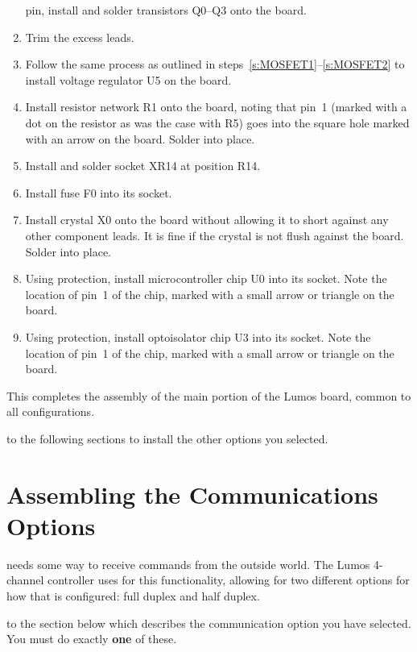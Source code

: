\documentclass[letterpaper,twoside,onecolumn,openright,final]{memoir}
\begin{document}
\begin{enumerate}
	pin, install and solder transistors Q0--Q3 onto the board.
\item\label{s:MOSFET2}
	Trim the excess leads.
\item
	Follow the same process as outlined in steps~\ref{s:MOSFET1}--\ref{s:MOSFET2}
	to install voltage regulator U5 on the board.
\item
	Install resistor network R1 onto the board, noting that pin~1 (marked
	with a dot on the resistor as was the case with R5) goes into the
	square hole marked with an arrow on the board.  Solder into place.
\item	Install and solder socket XR14 at position R14.
\item	Install fuse F0 into its socket.
\item 	Install crystal X0 onto the board without allowing it to short
	against any other component leads.  It is fine if the crystal
	is not flush against the board.  Solder into place.
\item	Using  protection, install microcontroller chip U0 into its socket.  Note the location of pin~1 of the chip, marked with a small 
	arrow or triangle on the board.
\item	Using  protection, install optoisolator chip U3 into its socket.  Note the location of pin~1 of the chip, marked with a small 
	arrow or triangle on the board.
\end{enumerate}

This completes the assembly of the main portion of the Lumos board, common to all configurations.

\bigskip

 to the following sections
to install the other options you selected.

\chapter{Assembling the Communications Options}\label{ch:comms}
 needs some way to receive commands from the outside
world.  The Lumos 4-channel  controller uses  for this functionality,
allowing for two different options for how that is configured:
full duplex and half duplex.

\bigskip

 to the section below which describes the communication option
you have selected.  You must do exactly {\bfseries one} of these.
\end{document}
